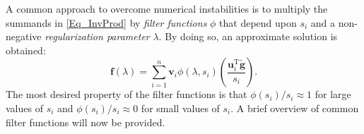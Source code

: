 \documentclass[12pt]{article}
\newcommand{\gnoise}{\widetilde{\mathbf{g}}}
\newcommand{\fdis}{\mathbf{f}}
\newcommand{\trans}{\mathrm{T}}	%
\newcommand{\regparam}{\lambda}
\newcommand{\filt}{\phi}
\newcommand{\singular}{s}	%
\newcommand{\LSV}{\mathbf{u}}	%
\newcommand{\RSV}{\mathbf{v}}	%
\begin{document}
A common approach to overcome numerical instabilities is to multiply the summands in \eqref{Eq_InvProd} by \textit{filter functions} $\filt$ that depend upon $\singular_i$ and a non-negative \textit{regularization parameter} $\regparam$. By doing so, an approximate solution is obtained:
\begin{equation}
\fdis(\regparam) = \sum_{i = 1}^n \RSV_i\filt(\regparam,\singular_i)\left(\frac{{\LSV^\trans_i}\gnoise}{\singular_i}\right).
\label{Eq_ApproxSol}
\end{equation}
The most desired property of the filter functions is that $\filt(\singular_i)/\singular_i \approx 1$  for large values of $\singular_i$ and $\filt(\singular_i)/\singular_i \approx 0$ for small values of $\singular_i$. A brief overview of common filter functions will now be provided. 
\end{document}

